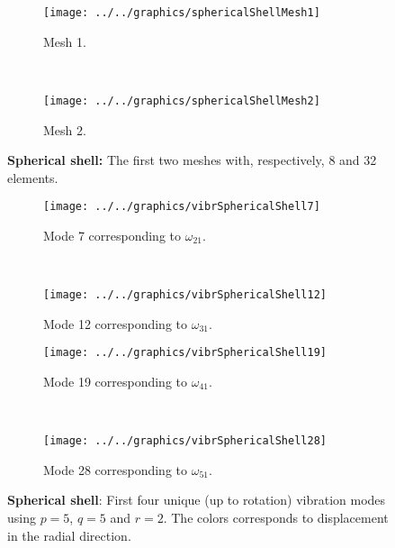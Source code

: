 \begin{figure}
	\centering        
	\begin{subfigure}{0.47\textwidth}
		\centering   
		\texttt{[image: ../../graphics/sphericalShellMesh1]}
		\caption{Mesh 1.}
		\label{Fig2:shericalShellMesh2_1}
	\end{subfigure}
	~ 
	\begin{subfigure}{0.47\textwidth}
		\centering   
		\texttt{[image: ../../graphics/sphericalShellMesh2]}
		\caption{Mesh 2.}
	\end{subfigure}
	\caption[Meshes of a spherical shell]{\textbf{Spherical shell:} The first two meshes with, respectively, 8 and 32 elements.}
	\label{Fig2:shericalShellMesh2}
	\par\bigskip	
	\begin{subfigure}{0.47\textwidth}
		\centering   
		\texttt{[image: ../../graphics/vibrSphericalShell7]}
		\caption{Mode 7 corresponding to $\omega_{21}$.}
	\end{subfigure}
	~
	\begin{subfigure}{0.47\textwidth}
		\centering   
		\texttt{[image: ../../graphics/vibrSphericalShell12]}
		\caption{Mode 12 corresponding to $\omega_{31}$.}
	\end{subfigure}
	\par\bigskip
	\begin{subfigure}{0.47\textwidth}
		\centering   
		\texttt{[image: ../../graphics/vibrSphericalShell19]}
		\caption{Mode 19 corresponding to $\omega_{41}$.}
	\end{subfigure}
	~
	\begin{subfigure}{0.47\textwidth}
		\centering   
		\texttt{[image: ../../graphics/vibrSphericalShell28]}
		\caption{Mode 28 corresponding to $\omega_{51}$.}
	\end{subfigure}
	\caption[Vibration modes of spherical shell]{\textbf{Spherical shell}: First four unique (up to rotation) vibration modes using $p=5$, $q=5$ and $r=2$. The colors corresponds to displacement in the radial direction.}
	\label{Fig2:EigenModesSphericalShell}
\end{figure}
